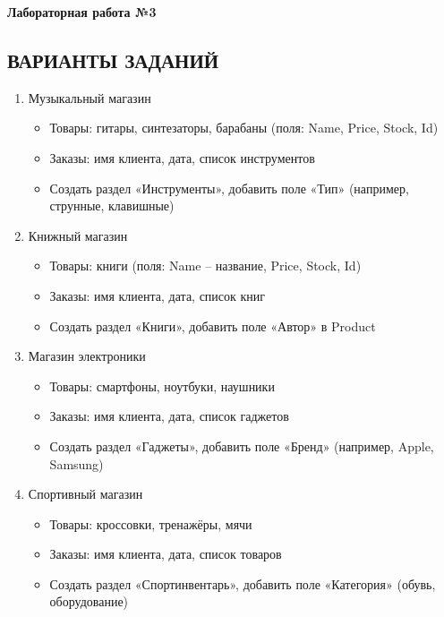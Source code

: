 \documentclass[12pt]{article}
\newcommand{\lablogo}
{
\begin{center}
    \huge{\textbf{Лабораторная работа №3}} \\
\end{center}
}
\renewcommand{\texttt}[1]{{\small\ttfamily #1}}
\numberwithin{listing}{section}
\numberwithin{figure}{section}
\begin{document}
\lablogo

\begin{center}
	\subsection{ВАРИАНТЫ ЗАДАНИЙ}
\end{center}

\begin{enumerate}
\item Музыкальный магазин
\begin{itemize}
	\item Товары: гитары, синтезаторы, барабаны (поля: \texttt{Name}, \texttt{Price}, \texttt{Stock}, \texttt{Id})
	\item Заказы: имя клиента, дата, список инструментов
	\item Создать раздел «Инструменты», добавить поле «Тип» (например, струнные, клавишные)
\end{itemize}

\item Книжный магазин
\begin{itemize}
	\item Товары: книги (поля: \texttt{Name} -- название, \texttt{Price}, \texttt{Stock}, \texttt{Id})
	\item Заказы: имя клиента, дата, список книг
	\item Создать раздел «Книги», добавить поле «Автор» в \texttt{Product}
\end{itemize}

\item Магазин электроники
\begin{itemize}
	\item Товары: смартфоны, ноутбуки, наушники
	\item Заказы: имя клиента, дата, список гаджетов
	\item Создать раздел «Гаджеты», добавить поле «Бренд» (например, Apple, Samsung)
\end{itemize}


\item Спортивный магазин
\begin{itemize}
	\item Товары: кроссовки, тренажёры, мячи
	\item Заказы: имя клиента, дата, список товаров
	\item Создать раздел «Спортинвентарь», добавить поле «Категория» (обувь, оборудование)
\end{itemize}


\end{enumerate}
\end{document}
